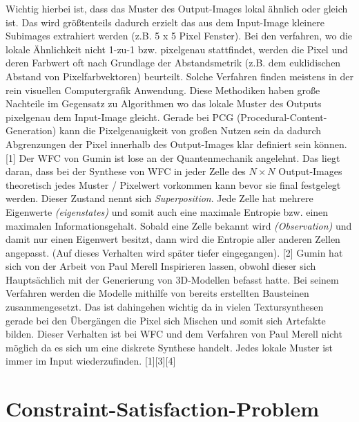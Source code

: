 \documentclass[12pt]{report}
\begin{document}
Wichtig hierbei ist, dass das Muster des Output-Images lokal ähnlich oder gleich ist.
Das wird größtenteils dadurch erzielt das aus dem Input-Image kleinere Subimages extrahiert werden {(z.B. 5 x 5 Pixel Fenster)}.
Bei den verfahren, wo die lokale Ähnlichkeit nicht 1-zu-1 bzw. pixelgenau stattfindet, werden die Pixel und deren Farbwert oft nach Grundlage der Abstandsmetrik {(z.B. dem euklidischen Abstand von Pixelfarbvektoren)} beurteilt.
Solche Verfahren finden meistens in der rein visuellen Computergrafik Anwendung.
Diese Methodiken haben große Nachteile im Gegensatz zu Algorithmen wo das lokale Muster des Outputs pixelgenau dem Input-Image gleicht.
Gerade bei PCG {(Procedural-Content-Generation)} kann die Pixelgenauigkeit von großen Nutzen sein da dadurch Abgrenzungen der Pixel innerhalb des Output-Images klar definiert sein können.
{[1]}
Der WFC von Gumin ist lose an der Quantenmechanik angelehnt.
Das liegt daran, dass bei der Synthese von WFC in jeder Zelle des $N\times N$ Output-Images theoretisch jedes Muster / Pixelwert vorkommen kann bevor sie final festgelegt werden.
Dieser Zustand nennt sich \textit{Superposition}.
Jede Zelle hat mehrere Eigenwerte \textit{(eigenstates)} und somit auch eine maximale Entropie bzw. einen maximalen Informationsgehalt.
Sobald eine Zelle bekannt wird \textit{(Observation)} und damit nur einen Eigenwert besitzt, dann wird die Entropie aller anderen Zellen angepasst.
{(Auf dieses Verhalten wird später tiefer eingegangen)}. {[2]}
Gumin hat sich von der Arbeit von Paul Merell Inspirieren lassen, obwohl dieser sich Hauptsächlich mit der Generierung von 3D-Modellen befasst hatte.
Bei seinem Verfahren werden die Modelle mithilfe von bereits erstellten Bausteinen zusammengesetzt.
Das ist dahingehen wichtig da in vielen Textursynthesen gerade bei den Übergängen die Pixel sich Mischen und somit sich Artefakte bilden.
Dieser Verhalten ist bei WFC und dem Verfahren von Paul Merell nicht möglich da es sich um eine diskrete Synthese handelt.
Jedes lokale Muster ist immer im Input wiederzufinden. {[1]}{[3]}{[4]}

\section{Constraint-Satisfaction-Problem}
\end{document}
